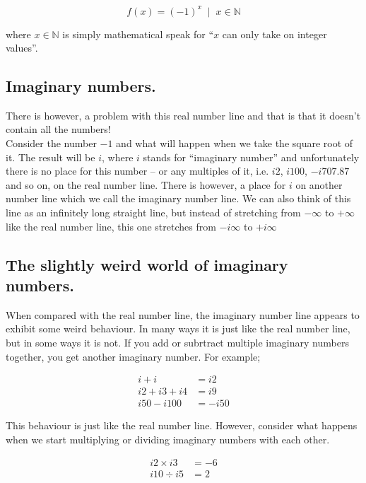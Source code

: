\documentclass{article}
\begin{document}
\begin{equation}
f(x) = (-1)^{x} \;\; \vert \;\; x \in \mathbb{N} 
\end{equation}

where \(x \in \mathbb{N}\) is simply mathematical speak for ``$x$ can only take on integer values''.


\subsection{Imaginary numbers.}

There is however, a problem with this real number line and that is that it doesn't contain all the numbers!\\ 

Consider the number $-1$ and what will happen when we take the square root of it. The result will be $i$, where 
$i$ stands for ``imaginary number'' and unfortunately there is no place for this number -- or any multiples of it,
i.e. $i2$, $i100$, $-i707.87$ and so on, on the real number line. There is however, a place for $i$ on another
number line which we call the imaginary number line. We can also think
of this line as an infinitely long straight line, but instead of stretching from $-\infty$ to $+\infty$ like the real
number line, this one stretches from $-i\infty$ to $+i\infty$


\subsection{The slightly weird world of imaginary numbers.}

When compared with the real number line, the imaginary number line appears to exhibit some weird behaviour. 
In many ways it is just like the real number line, but in some ways it is not. If you add or subrtract multiple imaginary numbers together, you get another imaginary number. For example;

\begin{align*}
i + i &= i2 \\
i2 + i3 + i4 &= i9 \\
i50 - i100 &= -i50 
\end{align*}

This behaviour is just like the real number line. However, consider what happens when we start multiplying or dividing
imaginary numbers with each other.

\begin{align*}
i2 \times i3 &= -6 \\
i10 \div i5 &= 2 
\end{align*}
\end{document}
